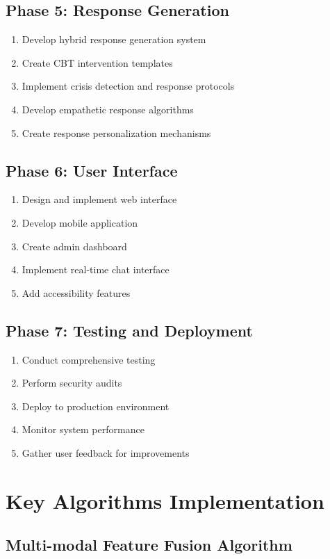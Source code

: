 \documentclass[11pt]{report}
\begin{document}
\subsection{Phase 5: Response Generation}
\begin{enumerate}
    \item Develop hybrid response generation system
    \item Create CBT intervention templates
    \item Implement crisis detection and response protocols
    \item Develop empathetic response algorithms
    \item Create response personalization mechanisms
\end{enumerate}

\subsection{Phase 6: User Interface}
\begin{enumerate}
    \item Design and implement web interface
    \item Develop mobile application
    \item Create admin dashboard
    \item Implement real-time chat interface
    \item Add accessibility features
\end{enumerate}

\subsection{Phase 7: Testing and Deployment}
\begin{enumerate}
    \item Conduct comprehensive testing
    \item Perform security audits
    \item Deploy to production environment
    \item Monitor system performance
    \item Gather user feedback for improvements
\end{enumerate}

\section{Key Algorithms Implementation}

\subsection{Multi-modal Feature Fusion Algorithm}
\end{document}
